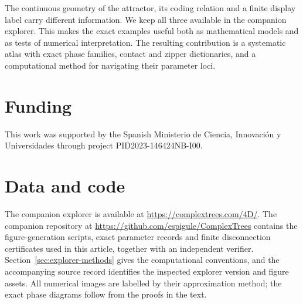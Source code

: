 \documentclass[11pt,a4paper]{article}
\theoremstyle{plain}
\theoremstyle{definition}
\theoremstyle{remark}
\begin{document}
The continuous geometry of the attractor, its coding relation and a finite
display label carry different information. We keep all three available in the
companion explorer. This makes the exact examples useful both as mathematical
models and as tests of numerical interpretation. The resulting contribution is
a systematic atlas with exact phase families, contact and zipper dictionaries,
and a computational method for navigating their parameter loci.












\appendix


\section*{Funding}
This work was supported by the Spanish Ministerio de Ciencia, Innovaci\'on y
Universidades through project PID2023-146424NB-I00.

\section*{Data and code}
The companion explorer is available at \url{https://complextrees.com/4D/}.
The companion repository at \url{https://github.com/espigule/ComplexTrees}
contains the figure-generation scripts, exact parameter records and finite
disconnection certificates used in this article, together with an independent
verifier. Section~\ref{sec:explorer-methods} gives the
computational conventions, and the accompanying source record identifies the
inspected explorer version and figure assets. All numerical images are
labelled by their approximation method; the exact phase diagrams follow from
the proofs in the text.

{\small\raggedright\setlength{\parskip}{0pt}}
\end{document}
